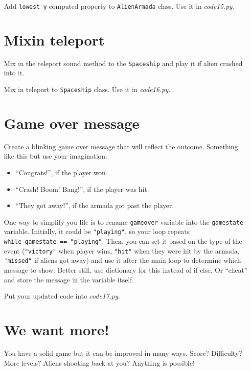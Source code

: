 \documentclass[
]{book}
\providecommand{\tightlist}{%
  \setlength{\itemsep}{0pt}\setlength{\parskip}{0pt}}
\begin{document}
Add \texttt{lowest\_y} computed property to \texttt{AlienArmada} class.
Use it in \emph{code15.py}.

\hypertarget{mixin-teleport}{%
\section{Mixin teleport}\label{mixin-teleport}}

Mix in the teleport sound method to the \texttt{Spaceship} and play it if alien crashed into it.

Mix in teleport to \texttt{Spaceship} class.
Use it in \emph{code16.py}.

\hypertarget{game-over-message}{%
\section{Game over message}\label{game-over-message}}

Create a blinking game over message that will reflect the outcome. Something like this but use your imagination:

\begin{itemize}
\tightlist
\item
  ``Congrats!'', if the player won.
\item
  ``Crash! Boom! Bang!'', if the player was hit.
\item
  ``They got away!'', if the armada got past the player.
\end{itemize}

One way to simplify you life is to rename \texttt{gameover} variable into the \texttt{gamestate} variable. Initially, it could be \texttt{"playing"}, so your loop repeats \texttt{while\ gamestate\ ==\ "playing"}. Then, you can set it based on the type of the event (\texttt{"victory"} when player wins, \texttt{"hit"} when they were hit by the armada, \texttt{"missed"} if aliens got away) and use it after the main loop to determine which message to show. Better still, use dictionary for this instead of if-else. Or ``cheat'' and store the message in the variable itself.

Put your updated code into \emph{code17.py}.

\hypertarget{we-want-more}{%
\section{We want more!}\label{we-want-more}}

You have a solid game but it can be improved in many ways. Score? Difficulty? More levels? Aliens shooting back at you? Anything is possible!
\end{document}
